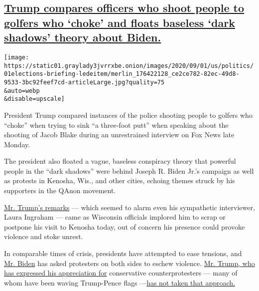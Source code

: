 \hypertarget{trump-compares-officers-who-shoot-people-to-golfers-who-choke-and-floats-baseless-dark-shadows-theory-about-biden}{%
\subsection{\texorpdfstring{\protect\hyperlink{trump-compares-officers-who-shoot-people-to-golfers-who-choke-and-floats-baseless-dark-shadows-theory-about-biden}{Trump
compares officers who shoot people to golfers who `choke' and floats
baseless `dark shadows' theory about
Biden.}}{Trump compares officers who shoot people to golfers who `choke' and floats baseless `dark shadows' theory about Biden.}}\label{trump-compares-officers-who-shoot-people-to-golfers-who-choke-and-floats-baseless-dark-shadows-theory-about-biden}}

\texttt{[image: https://static01.graylady3jvrrxbe.onion/images/2020/09/01/us/politics/01elections-briefing-ledeitem/merlin\_176422128\_ce2ce782-82ec-49d8-9533-3bc92feef7cd-articleLarge.jpg?quality=75\\\&auto=webp\\\&disable=upscale]}

President Trump compared instances of the police shooting people to
golfers who ``choke'' when trying to sink ``a three-foot putt'' when
speaking about the shooting of Jacob Blake during an unrestrained
interview on Fox News late Monday.

The president also floated a vague, baseless conspiracy theory that
powerful people in the ``dark shadows'' were behind Joseph R. Biden
Jr.'s campaign as well as protests in Kenosha, Wis., and other cities,
echoing themes struck by his supporters in the QAnon movement.

\href{https://www.foxnews.com/us/rump-tells-laura-ingraham-in-exclusive-interview-very-stupid-rich-people-supporting-protesters-in-dc-around-country}{Mr.
Trump's remarks} --- which seemed to alarm even his sympathetic
interviewer, Laura Ingraham --- came as Wisconsin officials implored him
to scrap or postpone his visit to Kenosha today, out of concern his
presence could provoke violence and stoke unrest.

In comparable times of crisis, presidents have attempted to ease
tensions, and
\href{https://www.nytimes3xbfgragh.onion/2020/09/01/us/politics/biden-trump-protests.html}{Mr.
Biden} has asked protesters on both sides to eschew violence.
\href{https://www.nytimes3xbfgragh.onion/2020/08/31/us/politics/trump-kenosha.html}{Mr.
Trump, who has expressed his appreciation for} conservative
counterprotesters --- many of whom have been waving Trump-Pence flags
---\href{https://www.nytimes3xbfgragh.onion/2020/08/31/us/politics/trump-kenosha.html}{has
not taken that approach.}

